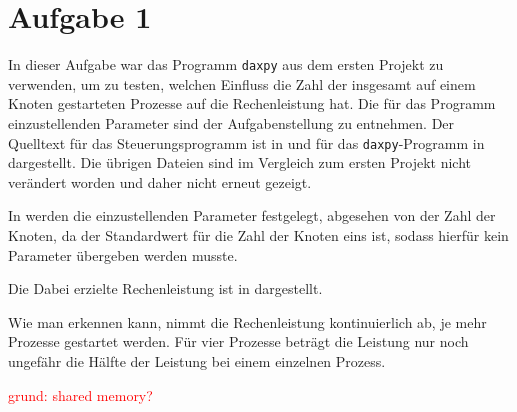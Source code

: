 \section*{Aufgabe 1}
In dieser Aufgabe war das Programm \texttt{daxpy} aus dem ersten Projekt zu verwenden,
um zu testen, welchen Einfluss die Zahl der insgesamt auf einem Knoten gestarteten
Prozesse auf die Rechenleistung hat. Die für das Programm einzustellenden Parameter
sind der Aufgabenstellung zu entnehmen. Der Quelltext für das Steuerungsprogramm
ist in  und für das \texttt{daxpy}-Programm in  dargestellt.
Die übrigen Dateien sind im Vergleich zum ersten Projekt nicht verändert worden
und daher nicht erneut gezeigt.




In  werden die einzustellenden Parameter festgelegt, abgesehen von
der Zahl der Knoten, da der Standardwert für die Zahl der Knoten eins ist, sodass
hierfür kein Parameter übergeben werden musste.

Die Dabei erzielte Rechenleistung ist in  dargestellt.



Wie man erkennen kann, nimmt die Rechenleistung kontinuierlich ab, je mehr Prozesse
gestartet werden. Für vier Prozesse beträgt die Leistung nur noch ungefähr die
Hälfte der Leistung bei einem einzelnen Prozess.

\textcolor{red}{grund: shared memory?}